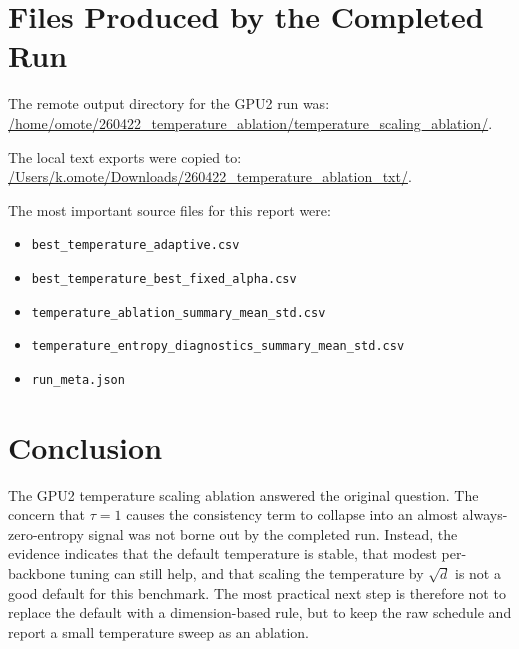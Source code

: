 \documentclass[11pt]{article}
\begin{document}
\section{Files Produced by the Completed Run}

The remote output directory for the GPU2 run was:
\url{/home/omote/260422_temperature_ablation/temperature_scaling_ablation/}.

The local text exports were copied to:
\url{/Users/k.omote/Downloads/260422_temperature_ablation_txt/}.

The most important source files for this report were:
\begin{itemize}
  \item \texttt{best\_temperature\_adaptive.csv}
  \item \texttt{best\_temperature\_best\_fixed\_alpha.csv}
  \item \texttt{temperature\_ablation\_summary\_mean\_std.csv}
  \item \texttt{temperature\_entropy\_diagnostics\_summary\_mean\_std.csv}
  \item \texttt{run\_meta.json}
\end{itemize}

\section{Conclusion}

The GPU2 temperature scaling ablation answered the original question. The concern that $\tau = 1$ causes the consistency term to collapse into an almost always-zero-entropy signal was not borne out by the completed run. Instead, the evidence indicates that the default temperature is stable, that modest per-backbone tuning can still help, and that scaling the temperature by $\sqrt{d}$ is not a good default for this benchmark. The most practical next step is therefore not to replace the default with a dimension-based rule, but to keep the raw schedule and report a small temperature sweep as an ablation.
\end{document}

